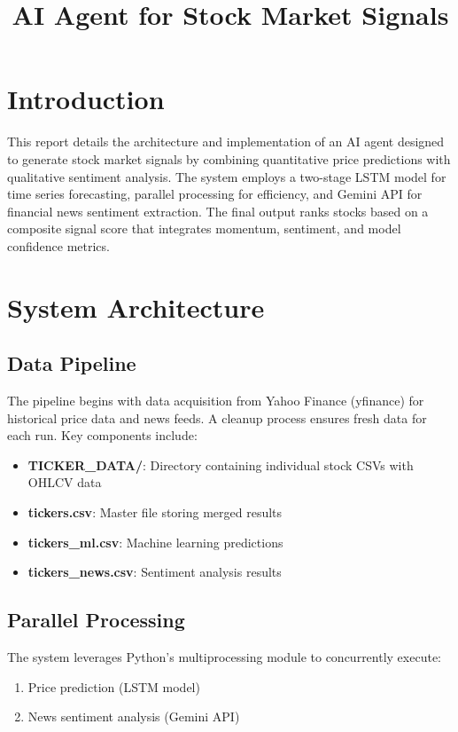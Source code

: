 \documentclass{article}
\title{AI Agent for Stock Market Signals}
\author{}
\date{}
\begin{document}
	
	\maketitle
	
	\section{Introduction}
	This report details the architecture and implementation of an AI agent designed to generate stock market signals by combining quantitative price predictions with qualitative sentiment analysis. The system employs a two-stage LSTM model for time series forecasting, parallel processing for efficiency, and Gemini API for financial news sentiment extraction. The final output ranks stocks based on a composite signal score that integrates momentum, sentiment, and model confidence metrics.
	
	\section{System Architecture}
	
	\subsection{Data Pipeline}
	The pipeline begins with data acquisition from Yahoo Finance (yfinance) for historical price data and news feeds. A cleanup process ensures fresh data for each run. Key components include:
	
	\begin{itemize}
		\item \textbf{TICKER\_DATA/}: Directory containing individual stock CSVs with OHLCV data
		\item \textbf{tickers.csv}: Master file storing merged results
		\item \textbf{tickers\_ml.csv}: Machine learning predictions
		\item \textbf{tickers\_news.csv}: Sentiment analysis results
	\end{itemize}
	
	\subsection{Parallel Processing}
	The system leverages Python's multiprocessing module to concurrently execute:
	\begin{enumerate}
		\item Price prediction (LSTM model)
		\item News sentiment analysis (Gemini API)
	\end{enumerate}
	
\end{document}
